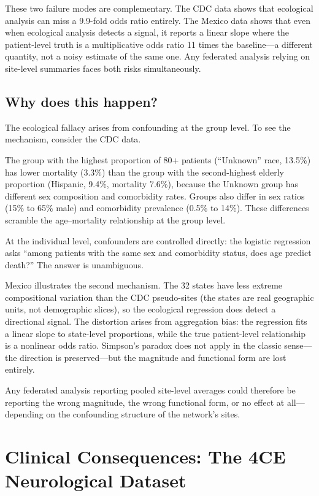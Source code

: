 \documentclass{article}
\begin{document}
These two failure modes are complementary.  The CDC data shows that
ecological analysis can miss a 9.9-fold odds ratio entirely.  The Mexico
data shows that even when ecological analysis detects a signal, it reports
a linear slope where the patient-level truth is a multiplicative odds ratio
11 times the baseline---a different quantity, not a noisy estimate of the
same one.  Any federated analysis relying on site-level summaries faces
both risks simultaneously.


\subsection{Why does this happen?}

The ecological fallacy arises from confounding at the group level.  To see
the mechanism, consider the CDC data.

The group with the highest proportion of 80+ patients (``Unknown'' race,
13.5\%) has lower mortality (3.3\%) than the group with the second-highest
elderly proportion (Hispanic, 9.4\%, mortality 7.6\%), because the Unknown
group has different sex composition and comorbidity rates.  Groups also
differ in sex ratios (15\% to 65\% male) and comorbidity prevalence (0.5\%
to 14\%).  These differences scramble the age--mortality relationship at the
group level.

At the individual level, confounders are controlled directly: the logistic
regression asks ``among patients with the same sex and comorbidity status,
does age predict death?''  The answer is unambiguous.

Mexico illustrates the second mechanism.  The 32 states have less extreme
compositional variation than the CDC pseudo-sites (the states are real
geographic units, not demographic slices), so the ecological regression does
detect a directional signal.  The distortion arises from aggregation bias:
the regression fits a linear slope to state-level proportions, while the
true patient-level relationship is a nonlinear odds ratio.  Simpson's
paradox does not apply in the classic sense---the direction is preserved---but
the magnitude and functional form are lost entirely.

Any federated analysis reporting pooled site-level averages could therefore
be reporting the wrong magnitude, the wrong functional form, or no effect
at all---depending on the confounding structure of the network's sites.


\section{Clinical Consequences: The 4CE Neurological Dataset}
\end{document}
